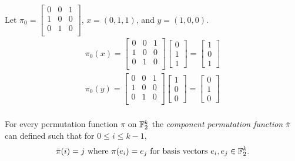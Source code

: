 \begin{example}
  Let $\pi_0=\begin{bmatrix}
               0&0&1\\
               1&0&0\\
               0&1&0\\
           \end{bmatrix}$, $x=(0,1,1)$, and $y=(1,0,0)$.
           \begin{align*}
             \pi_0(x)=\begin{bmatrix}
                 0&0&1\\
                 1&0&0\\
                 0&1&0\\
               \end{bmatrix}\begin{bmatrix}0\\1\\1\end{bmatrix}
                 =\begin{bmatrix}1\\0\\1\end{bmatrix}\\
             \pi_0(y)=\begin{bmatrix}
                 0&0&1\\
                 1&0&0\\
                 0&1&0\\
               \end{bmatrix}\begin{bmatrix}1\\0\\0\end{bmatrix}
                 =\begin{bmatrix}0\\1\\0\end{bmatrix}\\
           \end{align*}
\end{example}

\par For every permutation function $\pi$ on $\mathbb{F}_2^k$ the {\it component permutation
function} $\bar{\pi}$ can defined such that for $0 \leq i \leq k-1$,
\[
\bar{\pi}(i)=j \text{ where } \pi(e_i)=e_j \text{ for basis vectors } e_i,
e_j\in\mathbb{F}_2^k.
\]

